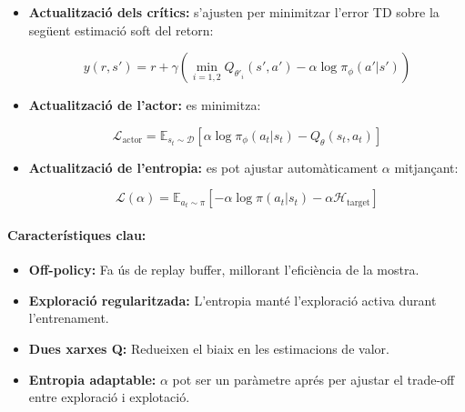 \documentclass[12pt,a4paper,twoside]{book}
\begin{document}
\begin{itemize}
  \item \textbf{Actualització dels crítics:} s'ajusten per minimitzar l'error TD sobre la següent estimació soft del retorn:

  \begin{equation}
  y(r,s') = r + \gamma \left( \min_{i=1,2} Q_{\theta'_i}(s', a') - \alpha \log \pi_\phi(a'|s') \right)
  \end{equation}

  \item \textbf{Actualització de l'actor:} es minimitza:

  \begin{equation}
  \mathcal{L}_{\text{actor}} = \mathbb{E}_{s_t \sim \mathcal{D}} \left[ \alpha \log \pi_\phi(a_t|s_t) - Q_{\theta}(s_t, a_t) \right]
  \end{equation}

  \item \textbf{Actualització de l'entropia:} es pot ajustar automàticament $\alpha$ mitjançant:

  \begin{equation}
  \mathcal{L}(\alpha) = \mathbb{E}_{a_t \sim \pi} \left[ -\alpha \log \pi(a_t|s_t) - \alpha \mathcal{H}_\text{target} \right]
  \end{equation}

\end{itemize}

\paragraph{Característiques clau:}

\begin{itemize}
  \item \textbf{Off-policy:} Fa ús de replay buffer, millorant l'eficiència de la mostra.
  \item \textbf{Exploració regularitzada:} L'entropia manté l'exploració activa durant l'entrenament.
  \item \textbf{Dues xarxes Q:} Redueixen el biaix en les estimacions de valor.
  \item \textbf{Entropia adaptable:} $\alpha$ pot ser un paràmetre aprés per ajustar el trade-off entre exploració i explotació.
\end{itemize}
\end{document}
